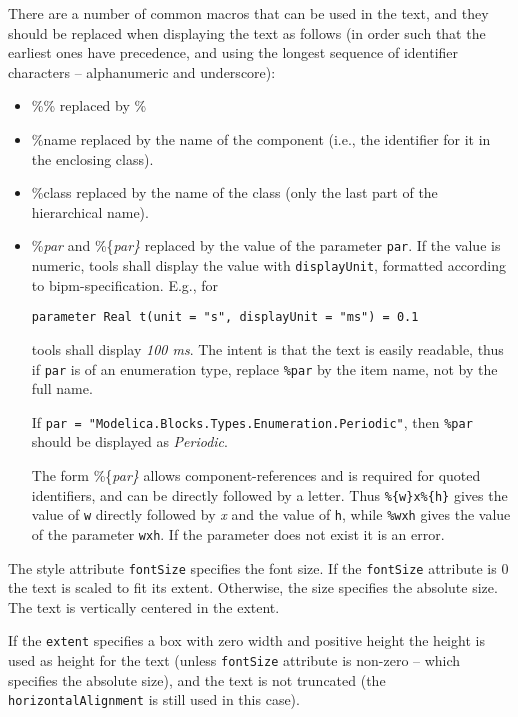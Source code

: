 There are a number of common macros that can be used in the text, and they should be replaced when displaying the text as follows (in order such that the earliest ones have precedence, and using the longest sequence of identifier characters -- alphanumeric and underscore):
\begin{itemize}
\item
  \%\% replaced by \%
\item
  \%name replaced by the name of the component (i.e., the identifier for
  it in the enclosing class).
\item
  \%class replaced by the name of the class (only the last part of the hierarchical name).
\item
  \%\emph{par} and \%\{\emph{par\}} replaced by the value of the
  parameter \lstinline!par!.
  If the value is numeric, tools shall display the value with \lstinline!displayUnit!, formatted according to bipm-specification.
  E.g., for
\begin{lstlisting}[language=modelica]
parameter Real t(unit = "s", displayUnit = "ms") = 0.1
\end{lstlisting}
  tools shall display \emph{100 ms}.
  The intent is that the text is easily readable,
  thus if \lstinline!par! is of an enumeration type, replace \lstinline!%par! by the item name,
  not by the full name.
  \begin{example}
  If \lstinline!par = "Modelica.Blocks.Types.Enumeration.Periodic"!, then \lstinline!%par! should be displayed as \emph{Periodic}.
  \end{example}
  The form \%\{\emph{par\}} allows component-references and is required for quoted identifiers, and can be directly
  followed by a letter. Thus \lstinline!%{w}x%{h}! gives the value of \lstinline!w!
  directly followed by \emph{x} and the value of \lstinline!h!, while \lstinline!%wxh! gives the value of the
  parameter \lstinline!wxh!. If the parameter does not exist it is an error.
\end{itemize}

The style attribute \lstinline!fontSize! specifies the font size. If the \lstinline!fontSize!
attribute is 0 the text is scaled to fit its extent. Otherwise, the size
specifies the absolute size. The text is vertically centered in the extent.

If the \lstinline!extent! specifies a box with zero width and positive height the
height is used as height for the text (unless \lstinline!fontSize! attribute is
non-zero -- which specifies the absolute size), and the text is not
truncated (the \lstinline!horizontalAlignment! is still used in this case).

